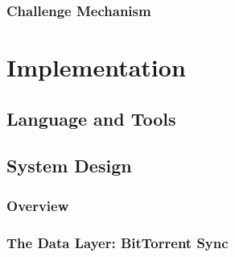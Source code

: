 \documentclass[12pt]{report}
\begin{document}
\subsection{Challenge Mechanism}

\section{}




\chapter{Implementation} \label{chap:impl}
\section{Language and Tools}



\section{System Design}
\subsection{Overview}


\subsection{The Data Layer: BitTorrent Sync}
\end{document}
